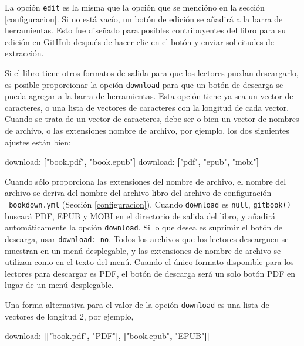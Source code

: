 \documentclass[12pt,]{krantz}
\makeatletter
\newenvironment{Shaded}{\begin{snugshade}}{\end{snugshade}}
\newcommand{\KeywordTok}[1]{\textcolor[rgb]{0.13,0.29,0.53}{\textbf{#1}}}
\newcommand{\StringTok}[1]{\textcolor[rgb]{0.31,0.60,0.02}{#1}}
\newcommand{\FunctionTok}[1]{\textcolor[rgb]{0.00,0.00,0.00}{#1}}
\newcommand{\AttributeTok}[1]{\textcolor[rgb]{0.77,0.63,0.00}{#1}}
\newenvironment{kframe}{%
\medskip{}
\setlength{\fboxsep}{.8em}
 \def\at@end@of@kframe{}%
 \ifinner\ifhmode%
  \def\at@end@of@kframe{\end{minipage}}%
  \begin{minipage}{\columnwidth}%
 \fi\fi%
 \def\FrameCommand##1{\hskip\@totalleftmargin \hskip-\fboxsep
 \colorbox{shadecolor}{##1}\hskip-\fboxsep
     \hskip-\linewidth \hskip-\@totalleftmargin \hskip\columnwidth}%
 \MakeFramed {\advance\hsize-\width
   \@totalleftmargin\z@ \linewidth\hsize
   \@setminipage}}%
 {\par\unskip\endMakeFramed%
 \at@end@of@kframe}
\renewenvironment{Shaded}{\begin{kframe}}{\end{kframe}}
\theoremstyle{definition}
\theoremstyle{definition}
\theoremstyle{definition}
\theoremstyle{remark}
\makeatother
\begin{document}
La opción \texttt{edit} es la misma que la opción que se mencióno en la
sección \ref{configuracion}. Si no está vacío, un botón de edición se
añadirá a la barra de herramientas. Esto fue diseñado para posibles
contribuyentes del libro para su edición en GitHub después de hacer clic
en el botón y enviar solicitudes de extracción.

Si el libro tiene otros formatos de salida para que los lectores puedan
descargarlo, es posible proporcionar la opción \texttt{download} para
que un botón de descarga se pueda agregar a la barra de herramientas.
Esta opción tiene ya sea un vector de caracteres, o una lista de
vectores de caracteres con la longitud de cada vector. Cuando se trata
de un vector de caracteres, debe ser o bien un vector de nombres de
archivo, o las extensiones nombre de archivo, por ejemplo, los dos
siguientes ajustes están bien:

\begin{Shaded}
\begin{Highlighting}[]
    \FunctionTok{download:}\AttributeTok{ }\KeywordTok{[}\StringTok{"book.pdf"}\KeywordTok{,} \StringTok{"book.epub"}\KeywordTok{]}
    \FunctionTok{download:}\AttributeTok{ }\KeywordTok{[}\StringTok{"pdf"}\KeywordTok{,} \StringTok{"epub"}\KeywordTok{,} \StringTok{"mobi"}\KeywordTok{]}
\end{Highlighting}
\end{Shaded}

Cuando sólo proporciona las extensiones del nombre de archivo, el nombre
del archivo se deriva del nombre del archivo libro del archivo de
configuración \texttt{\_bookdown.yml} (Sección \ref{configuracion}).
Cuando \texttt{download} es \texttt{null}, \texttt{gitbook()} buscará
PDF, EPUB y MOBI en el directorio de salida del libro, y añadirá
automáticamente la opción \texttt{download}. Si lo que desea es suprimir
el botón de descarga, usar \texttt{download:\ no}. Todos los archivos
que los lectores descarguen se muestran en un menú desplegable, y las
extensiones de nombre de archivo se utilizan como en el texto del menú.
Cuando el único formato disponible para los lectores para descargar es
PDF, el botón de descarga será un solo botón PDF en lugar de un menú
desplegable.

Una forma alternativa para el valor de la opción \texttt{download} es
una lista de vectores de longitud 2, por ejemplo,

\begin{Shaded}
\begin{Highlighting}[]
    \FunctionTok{download:}\AttributeTok{ }\KeywordTok{[[}\StringTok{"book.pdf"}\KeywordTok{,} \StringTok{"PDF"}\KeywordTok{],} \KeywordTok{[}\StringTok{"book.epub"}\KeywordTok{,} \StringTok{"EPUB"}\KeywordTok{]]}
\end{Highlighting}
\end{Shaded}
\end{document}
